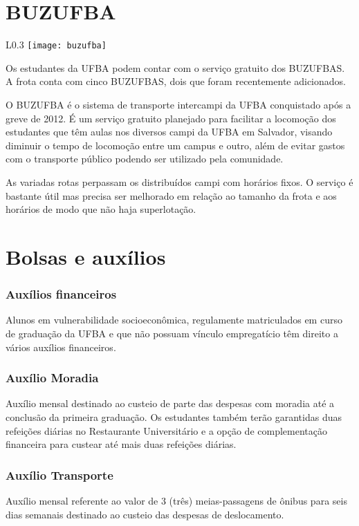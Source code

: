\section{BUZUFBA}
\begin{wrapfigure}{L}{0.3\textwidth}
	\centering
	\texttt{[image: buzufba]}
\end{wrapfigure}
Os estudantes da UFBA podem contar com o serviço gratuito dos BUZUFBAS. 
A frota conta com cinco BUZUFBAS, dois que foram recentemente adicionados.

    O BUZUFBA é o sistema de transporte intercampi da UFBA conquistado após a greve de 2012. É um serviço gratuito planejado para facilitar a locomoção dos estudantes que têm aulas nos diversos campi da UFBA em Salvador, visando diminuir o tempo de locomoção entre um campus e outro, além de evitar gastos com o transporte público podendo ser utilizado pela comunidade. 
    
    As variadas rotas perpassam os distribuídos campi com horários fixos. O serviço é bastante útil mas precisa ser melhorado em relação ao tamanho da frota e aos horários de modo que não haja superlotação.

\section{Bolsas e auxílios}
    \subsubsection{Auxílios financeiros}
        Alunos em vulnerabilidade socioeconômica, regulamente matriculados em curso de graduação da UFBA e que não possuam vínculo empregatício têm direito a vários auxílios financeiros.
    \subsubsection{Auxílio Moradia}
        Auxílio mensal destinado ao custeio de parte das despesas com moradia até a conclusão da primeira graduação. Os estudantes também terão garantidas duas refeições diárias no Restaurante Universitário e a opção de complementação financeira para custear até mais duas refeições diárias.
    \subsubsection{Auxílio Transporte}
        Auxílio mensal referente ao valor de 3 (três) meias-passagens de ônibus para seis dias semanais destinado ao custeio das despesas de deslocamento.
